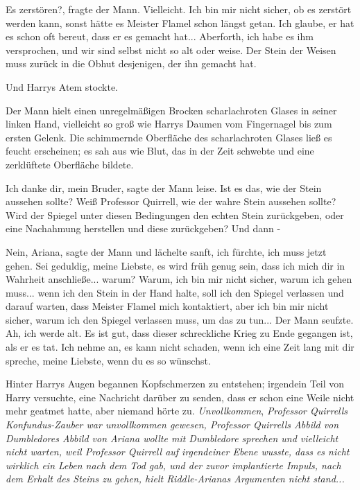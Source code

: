 \glqq{}Es zerstören?\grqq{}, fragte der Mann. \glqq{}Vielleicht. Ich bin mir nicht
sicher, ob es zerstört werden kann, sonst hätte es Meister Flamel schon längst
getan. Ich glaube, er hat es schon oft bereut, dass er es gemacht hat...
Aberforth, ich habe es ihm versprochen, und wir sind selbst nicht so alt oder
weise. Der Stein der Weisen muss zurück in die Obhut desjenigen, der ihn gemacht
hat.\grqq{}

Und Harrys Atem stockte.

Der Mann hielt einen unregelmäßigen Brocken scharlachroten Glases in seiner
linken Hand, vielleicht so groß wie Harrys Daumen vom Fingernagel bis zum ersten
Gelenk. Die schimmernde Oberfläche des scharlachroten Glases ließ es feucht
erscheinen; es sah aus wie Blut, das in der Zeit schwebte und eine zerklüftete
Oberfläche bildete.

\glqq{}Ich danke dir, mein Bruder\grqq{}, sagte der Mann leise. Ist es das, wie
der Stein aussehen sollte? Weiß Professor Quirrell, wie der wahre Stein aussehen
sollte? Wird der Spiegel unter diesen Bedingungen den echten Stein zurückgeben,
oder eine Nachahmung herstellen und diese zurückgeben? Und dann -

\glqq{}Nein, Ariana\grqq{}, sagte der Mann und lächelte sanft, \glqq{}ich fürchte,
ich muss jetzt gehen. Sei geduldig, meine Liebste, es wird früh genug sein, dass
ich mich dir in Wahrheit anschließe... warum? Warum, ich bin mir nicht sicher,
warum ich gehen muss... wenn ich den Stein in der Hand halte, soll ich den
Spiegel verlassen und darauf warten, dass Meister Flamel mich kontaktiert, aber
ich bin mir nicht sicher, warum ich den Spiegel verlassen muss, um das zu
tun...\grqq{} Der Mann seufzte. \glqq{}Ah, ich werde alt. Es ist gut, dass dieser
schreckliche Krieg zu Ende gegangen ist, als er es tat. Ich nehme an, es kann
nicht schaden, wenn ich eine Zeit lang mit dir spreche, meine Liebste, wenn du
es so wünschst.\grqq{}

Hinter Harrys Augen begannen Kopfschmerzen zu entstehen; irgendein Teil von
Harry versuchte, eine Nachricht darüber zu senden, dass er schon eine Weile
nicht mehr geatmet hatte, aber niemand hörte zu. \emph{Unvollkommen},
\emph{Professor Quirrells Konfundus-Zauber war unvollkommen gewesen, Professor
Quirrells Abbild von Dumbledores Abbild von Ariana wollte mit Dumbledore
sprechen und vielleicht nicht warten, weil Professor Quirrell auf irgendeiner
Ebene wusste, dass es nicht wirklich ein Leben nach dem Tod gab, und der zuvor
implantierte Impuls, nach dem Erhalt des Steins zu gehen, hielt Riddle-Arianas
Argumenten nicht stand...}

